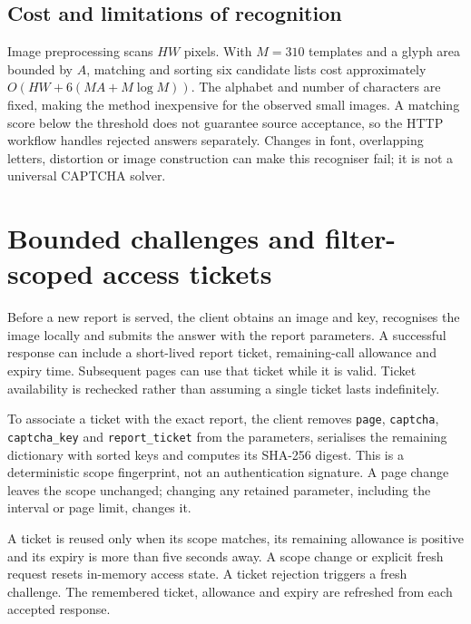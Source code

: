 \documentclass[12pt,a4paper,oneside]{report}
\numberwithin{equation}{chapter}
\numberwithin{figure}{chapter}
\numberwithin{table}{chapter}
\theoremstyle{definition}
\begin{document}
\subsection{Cost and limitations of recognition}
Image preprocessing scans $HW$ pixels. With $M=310$ templates and a glyph area bounded by $A$, matching and sorting six candidate lists cost approximately $O(HW+6(MA+M\log M))$. The alphabet and number of characters are fixed, making the method inexpensive for the observed small images. A matching score below the threshold does not guarantee source acceptance, so the HTTP workflow handles rejected answers separately. Changes in font, overlapping letters, distortion or image construction can make this recogniser fail; it is not a universal CAPTCHA solver.

\section{Bounded challenges and filter-scoped access tickets}
\label{sec:tickets}
Before a new report is served, the client obtains an image and key, recognises the image locally and submits the answer with the report parameters. A successful response can include a short-lived report ticket, remaining-call allowance and expiry time. Subsequent pages can use that ticket while it is valid. Ticket availability is rechecked rather than assuming a single ticket lasts indefinitely.

To associate a ticket with the exact report, the client removes \texttt{page}, \texttt{captcha}, \texttt{captcha\_key} and \texttt{report\_ticket} from the parameters, serialises the remaining dictionary with sorted keys and computes its SHA-256 digest. This is a deterministic scope fingerprint, not an authentication signature. A page change leaves the scope unchanged; changing any retained parameter, including the interval or page limit, changes it.

A ticket is reused only when its scope matches, its remaining allowance is positive and its expiry is more than five seconds away. A scope change or explicit fresh request resets in-memory access state. A ticket rejection triggers a fresh challenge. The remembered ticket, allowance and expiry are refreshed from each accepted response.
\end{document}
